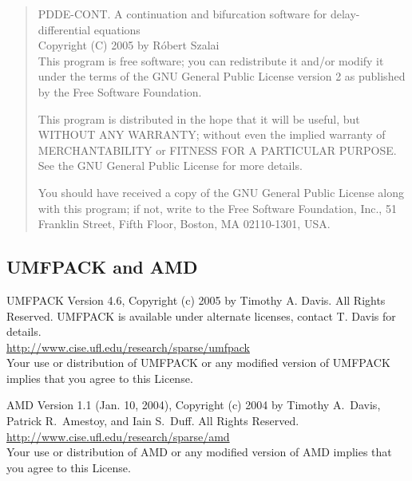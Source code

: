 \documentclass[10pt,a4paper]{ddedoc}
\begin{document}
\begin{quote}
PDDE-CONT. A continuation and bifurcation software for delay-differential
equations \\
Copyright (C) 2005 by R\'obert Szalai \\

This program is free software; you can redistribute it and/or modify
it under the terms of the GNU General Public License version 2 as published by
the Free Software Foundation.

This program is distributed in the hope that it will be useful,
but WITHOUT ANY WARRANTY; without even the implied warranty of
MERCHANTABILITY or FITNESS FOR A PARTICULAR PURPOSE.  See the
GNU General Public License for more details.

You should have received a copy of the GNU General Public License
along with this program; if not, write to the Free Software
Foundation, Inc., 51 Franklin Street, Fifth Floor, Boston, MA  02110-1301, USA.
\end{quote}

\subsection{UMFPACK and AMD}

\noindent
UMFPACK Version 4.6, Copyright (c) 2005 by Timothy A. Davis.
All Rights Reserved.
UMFPACK is available under alternate licenses, contact T. Davis for details.\\
\url{http://www.cise.ufl.edu/research/sparse/umfpack}\\
Your use or distribution of UMFPACK or any modified version of
UMFPACK implies that you agree to this License.

\noindent
AMD Version 1.1 (Jan. 10, 2004),
Copyright (c) 2004 by Timothy A.~Davis, Patrick R.~Amestoy, and Iain S.~Duff.
All Rights Reserved.\\
\url{http://www.cise.ufl.edu/research/sparse/amd}\\
Your use or distribution of AMD or any modified version of
AMD implies that you agree to this License.
\end{document}
